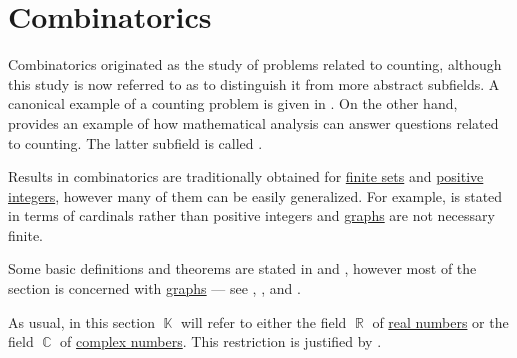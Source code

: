 \section{Combinatorics}\label{sec:combinatorics}

Combinatorics originated as the study of problems related to counting, although this study is now referred to as  to distinguish it from more abstract subfields. A canonical example of a counting problem is given in . On the other hand,  provides an example of how mathematical analysis can answer questions related to counting. The latter subfield is called .

Results in combinatorics are traditionally obtained for \hyperref[def:set_finiteness]{finite sets} and \hyperref[rem:peano_arithmetic_zero/positive]{positive integers}, however many of them can be easily generalized. For example,  is stated in terms of cardinals rather than positive integers and \hyperref[def:graph/directed]{graphs} are not necessary finite.

Some basic definitions and theorems are stated in  and , however most of the section is concerned with \hyperref[rem:directed_and_undirected_graphs]{graphs} --- see , ,  and .

As usual, in this section \( \BbbK \) will refer to either the field \( \BbbR \) of \hyperref[def:set_of_real_numbers]{real numbers} or the field \( \BbbC \) of \hyperref[def:set_of_real_numbers]{complex numbers}. This restriction is justified by .

